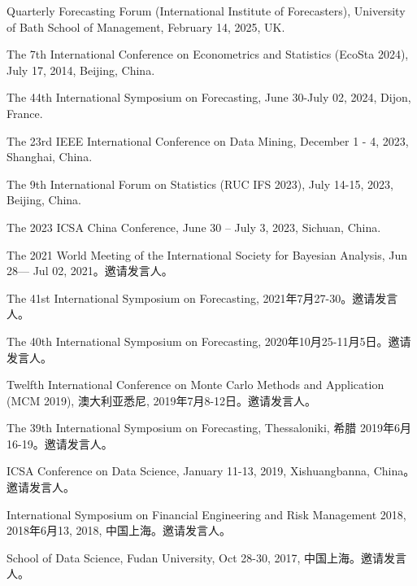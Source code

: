 \documentclass[twoside,a4paper,11pt]{article}
\begin{document}
\begin{etaremune}[itemsep=0ex,parsep=0pt]

\item Quarterly Forecasting Forum (International Institute of Forecasters), University of Bath School of Management, February 14, 2025, UK.

\item The 7th International Conference on Econometrics and Statistics (EcoSta 2024), July 17, 2014, Beijing, China.

\item The 44th International Symposium on Forecasting, June 30-July 02, 2024, Dijon, France.

\item The 23rd IEEE International Conference on Data Mining, December 1 - 4, 2023, Shanghai, China.

\item The 9th International Forum on Statistics (RUC IFS 2023), July 14-15, 2023, Beijing, China.

\item The 2023 ICSA China Conference, June 30 – July 3, 2023, Sichuan, China.

\item The 2021 World Meeting of the International Society for Bayesian Analysis, Jun
  28— Jul 02, 2021。邀请发言人。

\item The 41st International Symposium on Forecasting, 2021年7月27-30。邀请发言人。

\item The 40th International Symposium on Forecasting,  2020年10月25-11月5日。邀请发言人。

\item Twelfth International Conference on Monte Carlo Methods and Application (MCM 2019),
  澳大利亚悉尼, 2019年7月8-12日。邀请发言人。

\item The 39th International Symposium on Forecasting, Thessaloniki, 希腊 2019年6月16-19。邀请发言人。

\item ICSA Conference on Data Science, January 11-13, 2019, Xishuangbanna, China。邀请发言人。

\item International Symposium on Financial Engineering and Risk Management 2018, 2018年6月13,
  2018, 中国上海。邀请发言人。

\item School of Data Science, Fudan University, Oct 28-30, 2017, 中国上海。邀请发言人。


\end{etaremune}
\end{document}
